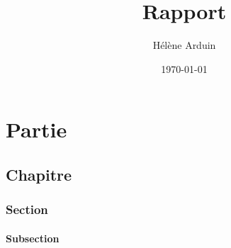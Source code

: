 \documentclass[a4paper,11pt]{report}
\title{Rapport}
\author{Hélène Arduin}
\date{\today}
\begin{document}
\maketitle

\part{Partie}
\chapter{Chapitre}
\section{Section}
\subsection{Subsection}
\end{document}
